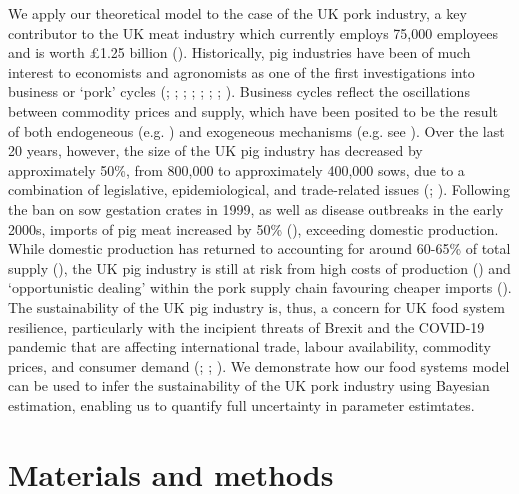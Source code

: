 \documentclass[12pt]{article}
\begin{document}
We apply our theoretical model to the case of the UK pork industry, a key contributor to the UK meat industry which currently employs 75,000 employees and is worth \pounds1.25 billion (\cite{DEFRA2019auk18}). Historically, pig industries have been of much interest to economists and agronomists as one of the first investigations into business or `pork' cycles (\cite{haldane1934}; \cite{coase1935}; \cite{ezekiel1938}; \cite{harlow1960}; \cite{meadows1971}; \cite{zawadzka2010}; \cite{parker2014}; \cite{sterman2000}). Business cycles reflect the oscillations between commodity prices and supply, which have been posited to be the result of both endogeneous (e.g. \cite{nerlove1958}) and exogeneous mechanisms (e.g. see \cite{gouel2012}). Over the last 20 years, however, the size of the UK pig industry has decreased by approximately 50\%, from 800,000 to approximately 400,000 sows, due to a combination of legislative, epidemiological, and trade-related issues (\cite{taylor2006}; \cite{dawson2009}). Following the ban on sow gestation crates in 1999, as well as disease outbreaks in the early 2000s, imports of pig meat increased by 50\% (\cite{DEFRApigcattlestats2020}), exceeding domestic production. While domestic production has returned to accounting for around 60-65\% of total supply (\cite{DEFRApigcattlestats2020}), the UK pig industry is still at risk from high costs of production (\cite{BPEXprofitability2011}) and `opportunistic dealing' within the pork supply chain favouring cheaper imports (\cite{bowman2013}). The sustainability of the UK pig industry is, thus, a concern for UK food system resilience, particularly with the incipient threats of Brexit and the COVID-19 pandemic that are affecting international trade, labour availability, commodity prices, and consumer demand (\cite{power2020}; \cite{feng2017}; \cite{poppy2019}). We demonstrate how our food systems model can be used to infer the sustainability of the UK pork industry using Bayesian estimation, enabling us to quantify full uncertainty in parameter estimtates.

\section{Materials and methods}
\end{document}
